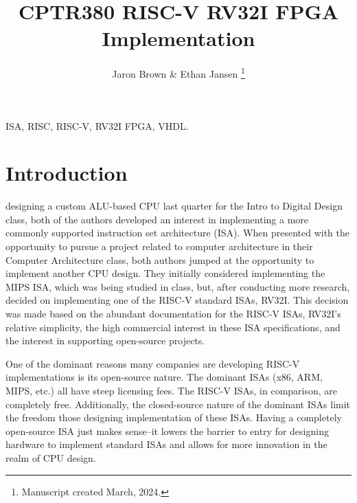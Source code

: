 \documentclass[lettersize,journal]{IEEEtran}
\begin{document}
\title{CPTR380 RISC-V RV32I FPGA Implementation}
\author{Jaron Brown \& Ethan Jansen
\thanks{Manuscript created March, 2024.}}

\maketitle

\begin{abstract}
\color{red}{TBD}
\end{abstract}

\begin{IEEEkeywords}
ISA, RISC, RISC-V, RV32I FPGA, VHDL.
\end{IEEEkeywords}


\section{Introduction}
 designing a custom ALU-based CPU last quarter for the Intro to Digital Design class, 
both of the authors developed an interest in implementing a more commonly supported instruction set architecture (ISA). 
When presented with the opportunity to pursue a project related to computer architecture in their Computer Architecture class, 
both authors jumped at the opportunity to implement another CPU design. They initially considered implementing the MIPS ISA, which was being studied in class, but, 
after conducting more research, decided on implementing one of the RISC-V standard ISAs, RV32I. This decision was made based on the abundant 
documentation for the RISC-V ISAs, RV32I's relative simplicity, the high commercial interest in these ISA specifications,
and the interest in supporting open-source projects.

One of the dominant reasons many companies are developing RISC-V implementations is its open-source nature. 
The dominant ISAs (x86, ARM, MIPS, etc.) all have steep licensing fees. The RISC-V ISAs, in comparison, are completely free. 
Additionally, the closed-source nature of the dominant ISAs limit the freedom those designing implementation of these ISAs. 
Having a completely open-source ISA just makes sense--it lowers the barrier to entry for designing hardware to implement standard 
ISAs and allows for more innovation in the realm of CPU design.  
\end{document}
